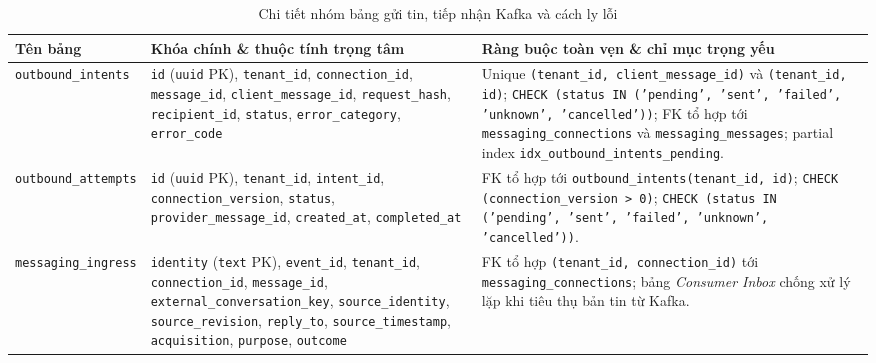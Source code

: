 \begin{table}[htbp]
  \centering
  \footnotesize
  \setlength{\tabcolsep}{4pt}
  \renewcommand{\arraystretch}{1.15}
  \caption{Chi tiết nhóm bảng gửi tin, tiếp nhận Kafka và cách ly lỗi}\label{tab:app-messaging-delivery}
  \begin{tabularx}{\linewidth}{@{}
    >{\raggedright\arraybackslash}p{3.4cm}
    >{\raggedright\arraybackslash}p{5.0cm}
    >{\raggedright\arraybackslash}X@{}}
    \toprule
    Tên bảng & Khóa chính \& thuộc tính trọng tâm & Ràng buộc toàn vẹn \& chỉ mục trọng yếu \\
    \midrule
    \texttt{outbound\_\hspace{0pt}intents} &
    \texttt{id} (\texttt{uuid} PK), \texttt{tenant\_id}, \texttt{connection\_id}, \texttt{message\_id}, \texttt{client\_message\_id}, \texttt{request\_hash}, \texttt{recipient\_id}, \texttt{status}, \texttt{error\_category}, \texttt{error\_code} &
    Unique \texttt{(tenant\_id, client\_message\_id)} và \texttt{(tenant\_id, id)}; \texttt{CHECK (status IN ('pending', 'sent', 'failed', 'unknown', 'cancelled'))}; FK tổ hợp tới \texttt{messaging\_\hspace{0pt}connections} và \texttt{messaging\_\hspace{0pt}messages}; partial index \texttt{idx\_\hspace{0pt}outbound\_\hspace{0pt}intents\_\hspace{0pt}pending}. \\
    \texttt{outbound\_\hspace{0pt}attempts} &
    \texttt{id} (\texttt{uuid} PK), \texttt{tenant\_id}, \texttt{intent\_id}, \texttt{connection\_version}, \texttt{status}, \texttt{provider\_message\_id}, \texttt{created\_at}, \texttt{completed\_at} &
    FK tổ hợp tới \texttt{outbound\_\hspace{0pt}intents(tenant\_id, id)}; \texttt{CHECK (connection\_version > 0)}; \texttt{CHECK (status IN ('pending', 'sent', 'failed', 'unknown', 'cancelled'))}. \\
    \texttt{messaging\_\hspace{0pt}ingress} &
    \texttt{identity} (\texttt{text} PK), \texttt{event\_id}, \texttt{tenant\_id}, \texttt{connection\_id}, \texttt{message\_id}, \texttt{external\_conversation\_key}, \texttt{source\_identity}, \texttt{source\_revision}, \texttt{reply\_to}, \texttt{source\_timestamp}, \texttt{acquisition}, \texttt{purpose}, \texttt{outcome} &
    FK tổ hợp \texttt{(tenant\_id, connection\_id)} tới \texttt{messaging\_\hspace{0pt}connections}; bảng \emph{Consumer Inbox} chống xử lý lặp khi tiêu thụ bản tin từ Kafka. \\

\end{tabularx}
\end{table}
